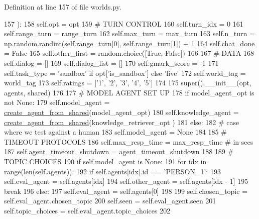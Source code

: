 Definition at line 157 of file worlds.\+py.


\begin{DoxyCode}
157     ):
158         self.opt = opt
159         \textcolor{comment}{# TURN CONTROL}
160         self.turn\_idx = 0
161         self.range\_turn = range\_turn
162         self.max\_turn = max\_turn
163         self.n\_turn = np.random.randint(self.range\_turn[0], self.range\_turn[1]) + 1
164         self.chat\_done = \textcolor{keyword}{False}
165         self.other\_first = random.choice([\textcolor{keyword}{True}, \textcolor{keyword}{False}])
166 
167         \textcolor{comment}{# DATA}
168         self.dialog = []
169         self.dialog\_list = []
170         self.gmark\_score = -1
171         self.task\_type = \textcolor{stringliteral}{'sandbox'} \textcolor{keywordflow}{if} opt[\textcolor{stringliteral}{'is\_sandbox'}] \textcolor{keywordflow}{else} \textcolor{stringliteral}{'live'}
172         self.world\_tag = world\_tag
173         self.ratings = [\textcolor{stringliteral}{'1'}, \textcolor{stringliteral}{'2'}, \textcolor{stringliteral}{'3'}, \textcolor{stringliteral}{'4'}, \textcolor{stringliteral}{'5'}]
174 
175         super().\_\_init\_\_(opt, agents, shared)
176 
177         \textcolor{comment}{# MODEL AGENT SET UP}
178         \textcolor{keywordflow}{if} model\_agent\_opt \textcolor{keywordflow}{is} \textcolor{keywordflow}{not} \textcolor{keywordtype}{None}:
179             self.model\_agent = \hyperlink{namespaceparlai_1_1core_1_1agents_aa5af5dd1d2f9da491b60348d479b849f}{create\_agent\_from\_shared}(model\_agent\_opt)
180             self.knowledge\_agent = \hyperlink{namespaceparlai_1_1core_1_1agents_aa5af5dd1d2f9da491b60348d479b849f}{create\_agent\_from\_shared}(knowledge\_retriever\_opt
      )
181         \textcolor{keywordflow}{else}:
182             \textcolor{comment}{# case where we test against a human}
183             self.model\_agent = \textcolor{keywordtype}{None}
184 
185         \textcolor{comment}{# TIMEOUT PROTOCOLS}
186         self.max\_resp\_time = max\_resp\_time  \textcolor{comment}{# in secs}
187         self.agent\_timeout\_shutdown = agent\_timeout\_shutdown
188 
189         \textcolor{comment}{# TOPIC CHOICES}
190         \textcolor{keywordflow}{if} self.model\_agent \textcolor{keywordflow}{is} \textcolor{keywordtype}{None}:
191             \textcolor{keywordflow}{for} idx \textcolor{keywordflow}{in} range(len(self.agents)):
192                 \textcolor{keywordflow}{if} self.agents[idx].id == \textcolor{stringliteral}{'PERSON\_1'}:
193                     self.eval\_agent = self.agents[idx]
194                     self.other\_agent = self.agents[idx - 1]
195                     \textcolor{keywordflow}{break}
196         \textcolor{keywordflow}{else}:
197             self.eval\_agent = self.agents[0]
198 
199         self.chosen\_topic = self.eval\_agent.chosen\_topic
200         self.seen = self.eval\_agent.seen
201         self.topic\_choices = self.eval\_agent.topic\_choices
202 
\end{DoxyCode}


